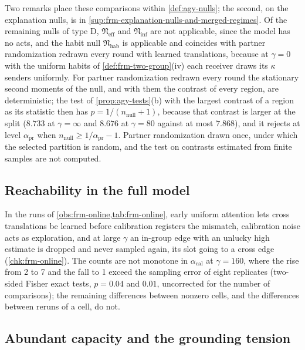 Two remarks place these comparisons within \cref{def:agy-nulls}; the second, on the explanation nulls, is in \cref{sup:frm-explanation-nulls-and-merged-regimes}. Of the remaining nulls of type D, $\mathfrak N_{\mathrm{eff}}$ and $\mathfrak N_{\mathrm{inf}}$ are not applicable, since the model has no acts, and the habit null $\mathfrak N_{\mathrm{hab}}$ is applicable and coincides with partner randomization redrawn every round with learned translations, because at $\gamma=0$ with the uniform habits of \cref{def:frm-two-group}(iv) each receiver draws its $\kappa$ senders uniformly. For partner randomization redrawn every round the stationary second moments of the null, and with them the contrast of every region, are deterministic; the test of \cref{prop:agy-tests}(b) with the largest contrast of a region as its statistic then has $p=1/(n_{\mathrm{null}}+1)$, because that contrast is larger at the split ($8.733$ at $\gamma=\infty$ and $8.676$ at $\gamma=80$ against at most $7.868$), and it rejects at level $\alpha_{\mathrm{pr}}$ when $n_{\mathrm{null}}\ge1/\alpha_{\mathrm{pr}}-1$. Partner randomization drawn once, under which the selected partition is random, and the test on contrasts estimated from finite samples are not computed.

\subsection{Reachability in the full model}\label{sup:frm-reachability-in-the-full-model}

In the runs of \cref{obs:frm-online,tab:frm-online}, early uniform attention lets cross translations be learned before calibration registers the mismatch, calibration noise acts as exploration, and at large $\gamma$ an in-group edge with an unlucky high estimate is dropped and never sampled again, its slot going to a cross edge (\cref{chk:frm-online}). The counts are not monotone in $\alpha_{\mathrm{cal}}$ at $\gamma=160$, where the rise from 2 to 7 and the fall to 1 exceed the sampling error of eight replicates (two-sided Fisher exact tests, $p=0.04$ and $0.01$, uncorrected for the number of comparisons); the remaining differences between nonzero cells, and the differences between reruns of a cell, do not.

\subsection{Abundant capacity and the grounding tension}\label{sup:frm-abundant-capacity-and-the-grounding-tens}

